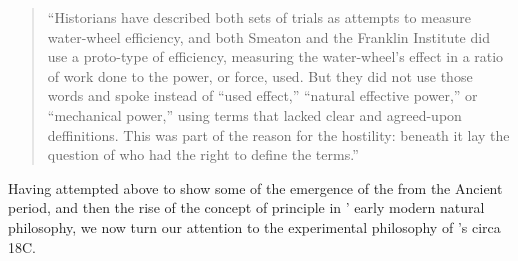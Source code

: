 \documentclass[a4paper, 12pt]{article}
\begin{document}
\begin{quotation}
    ``Historians have described both sets of trials as attempts to measure water-wheel efficiency, and both Smeaton and the Franklin Institute did use a proto-type of efficiency, measuring the water-wheel's effect in a ratio of work done to the power, or force, used. But they did not use those words and spoke instead of “used effect,” “natural effective power,” or “mechanical power,” using terms that lacked clear and agreed-upon deffinitions. This was part of the reason for the hostility: beneath it lay the question of who had the right to define the terms.'' \citet[p.~17]{alexanderMantraEfficiencyWaterwheel2008} 
\end{quotation}

Having attempted above to show some of the emergence of the \SEs from the Ancient period, and then the rise of the concept of principle in \citeauthor*{descartes_principles_1982}' early modern natural philosophy, we now turn our attention to the experimental philosophy of \citet{smeaton_experimental_1759,smeaton_experimental_1776}'s circa 18C. 








\end{document}
